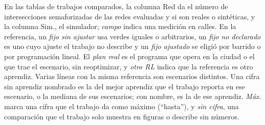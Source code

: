 En las tablas de trabajos comparados, la columna Red da el número de
intersecciones semaforizadas de las redes evaluadas y si son reales o
sintéticas, y la columna Sim., el simulador; \emph{campo} indica una
medición en calles. En la referencia, un \emph{fijo sin ajustar} usa
verdes iguales o arbitrarios, un \emph{fijo no declarado} es uno cuyo
ajuste el trabajo no describe y un \emph{fijo ajustado} se eligió por
barrido o por programación lineal. El \emph{plan real} es el programa
que opera en la ciudad o el que trae el escenario, sin reoptimizar, y
\emph{otro RL} indica que la referencia es otro aprendiz. Varias líneas
con la misma referencia son escenarios distintos. Una cifra sin
aprendiz nombrado es la del mejor aprendiz que el trabajo reporta en ese
escenario, o la mediana de sus escenarios; con nombre, es la de ese
aprendiz. \emph{Máx.} marca una cifra que el trabajo da como máximo
(``hasta''), y \emph{sin cifra}, una comparación que el trabajo solo
muestra en figuras o describe sin números.


